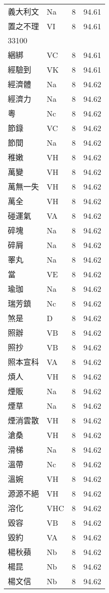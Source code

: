 \documentclass[twocolumn]{book}
\begin{document}
\begin{supertabular}{llrr}
義大利文 & Na & 8 &  94.61\\
置之不理 & VI & 8 &  94.61\\
33100\\
綑綁 & VC & 8 &  94.61\\
經驗到 & VK & 8 &  94.61\\
經濟體 & Na & 8 &  94.62\\
經濟力 & Na & 8 &  94.62\\
粵 & Nc & 8 &  94.62\\
節錄 & VC & 8 &  94.62\\
節間 & Na & 8 &  94.62\\
稚嫩 & VH & 8 &  94.62\\
萬變 & VH & 8 &  94.62\\
萬無一失 & VH & 8 &  94.62\\
萬全 & VH & 8 &  94.62\\
碰運氣 & VA & 8 &  94.62\\
碎塊 & Na & 8 &  94.62\\
碎屑 & Na & 8 &  94.62\\
睪丸 & Na & 8 &  94.62\\
當 & VE & 8 &  94.62\\
瑜珈 & Na & 8 &  94.62\\
瑞芳鎮 & Nc & 8 &  94.62\\
煞是 & D & 8 &  94.62\\
照辦 & VB & 8 &  94.62\\
照抄 & VB & 8 &  94.62\\
照本宣科 & VA & 8 &  94.62\\
煩人 & VH & 8 &  94.62\\
煙販 & Na & 8 &  94.62\\
煙草 & Na & 8 &  94.62\\
煙消雲散 & VH & 8 &  94.62\\
滄桑 & VH & 8 &  94.62\\
滑梯 & Na & 8 &  94.62\\
溫帶 & Nc & 8 &  94.62\\
溫婉 & VH & 8 &  94.62\\
源源不絕 & VH & 8 &  94.62\\
溶化 & VHC & 8 &  94.62\\
毀容 & VB & 8 &  94.62\\
毀約 & VA & 8 &  94.62\\
楊秋蘋 & Nb & 8 &  94.62\\
楊昆 & Nb & 8 &  94.62\\
楊文信 & Nb & 8 &  94.62\\

\end{supertabular}
\end{document}
